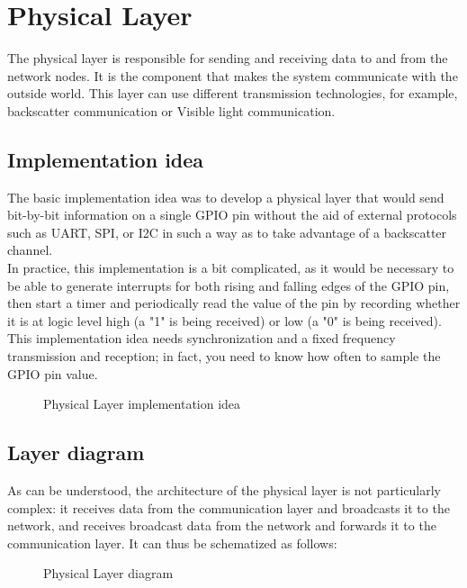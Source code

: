 \chapter{Physical Layer}
\label{cha:Physical Layer}
The physical layer is responsible for sending and receiving data to and from the network nodes. It is the component that makes the system communicate with the outside world. This layer can use different transmission technologies, for example, backscatter communication or Visible light communication.

\section{Implementation idea}
\label{sec:Implementation idea Phy}
The basic implementation idea was to develop a physical layer that would send bit-by-bit information on a single GPIO pin without the aid of external protocols such as UART, SPI, or I2C in such a way as to take advantage of a backscatter channel.\\
In practice, this implementation is a bit complicated, as it would be necessary to be able to generate interrupts for both rising and falling edges of the GPIO pin, then start a timer and periodically read the value of the pin by recording whether it is at logic level high (a "1" is being received) or low (a "0" is being received). This implementation idea needs synchronization and a fixed frequency transmission and reception; in fact, you need to know how often to sample the GPIO pin value.\\
  \begin{figure}[H]
    \centerline{}
    \caption{\footnotesize \centering Physical Layer implementation idea}
    \label{fig:PhysicalReadIdealApproach}
  \end{figure}

\section{Layer diagram}
\label{sec:Layer diagram Phy}
As can be understood, the architecture of the physical layer is not particularly complex: it receives data from the communication layer and broadcasts it to the network, and receives broadcast data from the network and forwards it to the communication layer. It can thus be schematized as follows:
  \begin{figure}[H]
    \centerline{}
    \caption{\footnotesize \centering Physical Layer diagram}
    \label{fig:PhysicalLayerDiagram}
  \end{figure}

